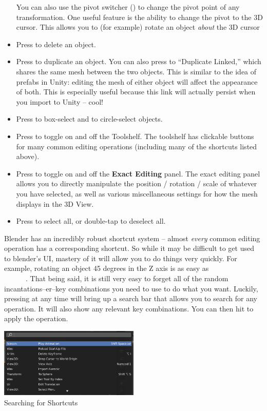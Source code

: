 \documentclass[11pt]{article}
\begin{document}
\begin{itemize}
    You can also use the pivot switcher
    () to change the pivot
    point of any transformation.  One useful feature is the ability to change the pivot to the 3D
    cursor.  This allows you to (for example) rotate an object \textit{about} the 3D cursor
    \item Press  to delete an object.
    \item Press  to duplicate an object.  You can also press  to 
    ``Duplicate Linked,'' which shares the same mesh between the two objects.  This is similar to
    the idea of prefabs in Unity: editing the mesh of either object will affect the appearance of
    both.  This is especially useful because this link will actually persist when you import to
    Unity -- cool!
    \item Press  to box-select and  to circle-select objects.
    \item Press  to toggle on and off the Toolshelf.  The toolshelf has clickable buttons
    for many common editing operations (including many of the shortcuts listed above).
    \item Press  to toggle on and off the \textbf{Exact Editing} panel.  The exact editing panel
    allows you to directly manipulate the position / rotation / scale of whatever you have selected,
    as well as various miscellaneous settings for how the mesh displays in the 3D View.
    \item Press  to select all, or double-tap  to deselect all.
\end{itemize}

Blender has an incredibly robust shortcut system -- almost \textit{every} common editing operation
has a corresponding shortcut.  So while it may be difficult to get used to blender's UI, mastery of
it will allow you to do things very quickly.  For example, rotating an object 45 degrees in
the Z axis is as easy as \\ \faAngleRight\  \faAngleRight\  \faAngleRight\ 
 \faAngleRight\ \keys{\return}.  That being said, it is still very easy to forget all of the random 
incantations--er--key combinations you need to use to do what you want.  Luckily, pressing \keys{F3} at
any time will bring up a search bar that allows you to search for any operation.  It will also show any
relevant key combinations.  You can then hit \keys{\return} to apply the operation.
\begin{center}
    \vbox{
    \includegraphics[width=0.5\textwidth]{search-diag}\\
    Searching for Shortcuts}
\end{center}
\end{document}
